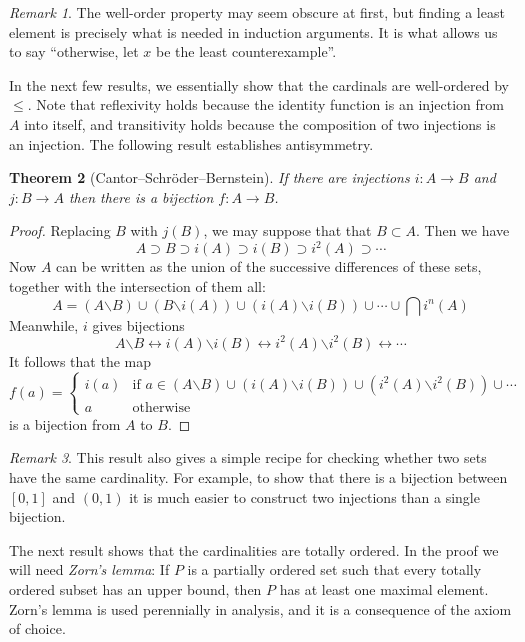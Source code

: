 \documentclass[11pt,oneside]{amsbook}
\theoremstyle{definition}
\theoremstyle{plain}
\newtheorem{thm}{Theorem}[section]
\theoremstyle{definition}
\theoremstyle{remark}
\newtheorem{rem}[thm]{Remark}
\numberwithin{equation}{section}
\numberwithin{figure}{section}
\begin{document}
\begin{rem}
  The well-order property may seem obscure at first, but finding a least element is precisely what is needed in induction arguments. It is what allows us to say ``otherwise, let $x$ be the least counterexample''.
\end{rem}

In the next few results, we essentially show that the cardinals are well-ordered by $\leq$. Note that reflexivity holds because the identity function is an injection from $A$ into itself, and transitivity holds because the composition of two injections is an injection. The following result establishes antisymmetry.

\begin{thm}[Cantor--Schr\"oder--Bernstein]
  \label{thm:csb}
  If there are injections $i\colon A\to B$ and $j\colon B\to A$ then there is a bijection $f\colon A\to B$.
\end{thm}

\begin{proof}
  Replacing $B$ with $j(B)$, we may suppose that that $B\subset A$. Then we have
  \[A\supset B\supset i(A)\supset i(B)\supset i^2(A)\supset\cdots
  \]
  Now $A$ can be written as the union of the successive differences of these sets, together with the intersection of them all:
  \[A=(A\mathord{\smallsetminus}B)\cup(B\mathord{\smallsetminus}i(A))
  \cup(i(A)\mathord{\smallsetminus}i(B))\cup\cdots\cup \bigcap i^n(A)
  \]
  Meanwhile, $i$ gives bijections
  \[A\mathord{\smallsetminus}B\leftrightarrow i(A)\mathord{\smallsetminus}i(B)\leftrightarrow i^2(A)\mathord{\smallsetminus}i^2(B)\leftrightarrow\cdots
  \]
  It follows that the map
  \[f(a)=\begin{cases}i(a)&\text{if }a\in(A\mathord{\smallsetminus}B)\cup(i(A)\mathord{\smallsetminus}i(B))\cup(i^2(A)\mathord{\smallsetminus}i^2(B))\cup\cdots\\
    a&\text{otherwise}
  \end{cases}
  \]
  is a bijection from $A$ to $B$.
\end{proof}

\begin{rem}
  This result also gives a simple recipe for checking whether two sets have the same cardinality. For example, to show that there is a bijection between $[0,1]$ and $(0,1)$ it is much easier to construct two injections than a single bijection.
\end{rem}

The next result shows that the cardinalities are totally ordered. In the proof we will need \emph{Zorn's lemma}: If $P$ is a partially ordered set such that every totally ordered subset has an upper bound, then $P$ has at least one maximal element.  Zorn's lemma is used perennially in analysis, and it is a consequence of the axiom of choice.
\end{document}
